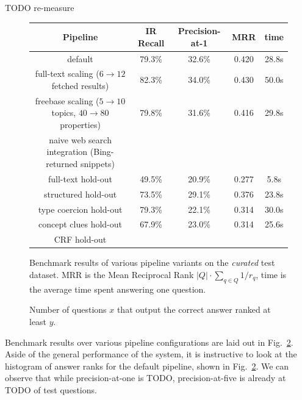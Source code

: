 TODO re-measure

\begin{figure}[t]
\renewcommand{\arraystretch}{1.3}
\centering
\begin{tabular}{|c|cccc|}
\hline
Pipeline & IR Recall & Precision-at-1 & MRR & time \\ \hline \hline
default & 79.3\% & 32.6\% & 0.420 & 28.8s \\
\hline
full-text scaling ($6\to12$ fetched results) & 82.3\% & 34.0\% & 0.430 & 50.0s \\
freebase scaling ($5\to10$ topics, $40\to80$ properties) & 79.8\% & 31.6\% & 0.416 & 29.8s \\
naive web search integration (Bing-returned snippets) & & & & \\
\hline
full-text hold-out & 49.5\% & 20.9\% & 0.277 & 5.8s \\
structured hold-out & 73.5\% & 29.1\% & 0.376 & 23.8s \\
\hline
type coercion hold-out & 79.3\% & 22.1\% & 0.314 & 30.0s \\
concept clues hold-out & 67.9\% & 23.0\% & 0.314 & 25.6s \\
CRF hold-out & & & & \\
\hline
\end{tabular}
\vspace*{-0.2cm}
\caption{Benchmark results of various pipeline variants on the \textit{curated} test dataset.
MRR is the Mean Reciprocal Rank $|Q|\cdot\sum_{q\in Q}{1/r_q}$, time is the average time spent answering one question.}
\label{fig:bench}
\end{figure}

\begin{figure}[t]
\begin{center}
\vspace*{-0.75cm}
\caption{Number of questions $x$ that output the correct answer ranked at least $y$.}
\label{fig:ranks}
\end{center}
\end{figure}%

Benchmark results over various pipeline configurations are laid out in Fig.~\ref{fig:ranks}.
Aside of the general performance of the system,
it is instructive to look at the histogram of answer ranks
for the default pipeline, shown in Fig.~\ref{fig:ranks}.
We can observe that while precision-at-one is TODO,
precision-at-five is already at TODO of test questions.

